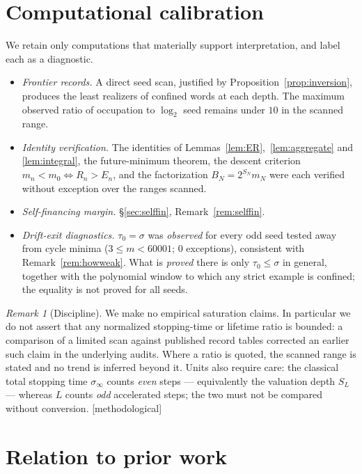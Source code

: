 \documentclass[11pt]{article}
\theoremstyle{plain}
\theoremstyle{definition}
\theoremstyle{remark}
\newtheorem{remark}[theorem]{Remark}
\newcommand{\status}[1]{\textsf{\footnotesize[#1]}}
\begin{document}
\section{Computational calibration}\label{sec:comp}

We retain only computations that materially support interpretation, and label each as a
diagnostic.

\begin{itemize}[leftmargin=1.4em]
\item \emph{Frontier records.} A direct seed scan, justified by Proposition~\ref{prop:inversion},
  produces the least realizers of confined words at each depth. The maximum observed ratio of
  occupation to $\log_2$ seed remains under $10$ in the scanned range.
\item \emph{Identity verification.} The identities of Lemmas~\ref{lem:ER},~\ref{lem:aggregate} and
  \ref{lem:integral}, the future-minimum theorem, the descent criterion $m_n<m_0\iff R_n>E_n$, and
  the factorization $B_N=2^{S_N}m_N$ were each verified without exception over the ranges scanned.
\item \emph{Self-financing margin.} \S\ref{sec:selffin}, Remark~\ref{rem:selffin}.
\item \emph{Drift-exit diagnostics.} $\tau_0=\sigma$ was \emph{observed} for every odd seed tested
  away from cycle minima ($3\le m<60001$; $0$ exceptions), consistent with
  Remark~\ref{rem:howweak}. What is \emph{proved} there is only $\tau_0\le\sigma$ in general,
  together with the polynomial window to which any strict example is confined; the equality is
  not proved for all seeds.
\end{itemize}

\begin{remark}[Discipline]\label{rem:compdiscipline}
We make no empirical saturation claims. In particular we do not assert that any normalized
stopping-time or lifetime ratio is bounded: a comparison of a limited scan against published record
tables corrected an earlier such claim in the underlying audits. Where a ratio is quoted, the
scanned range is stated and no trend is inferred beyond it. Units also require care: the classical
total stopping time $\sigma_\infty$ counts \emph{even} steps --- equivalently the valuation depth
$S_L$ --- whereas $L$ counts \emph{odd} accelerated steps; the two must not be compared without
conversion. \status{methodological}
\end{remark}

\section{Relation to prior work}\label{sec:prior}
\end{document}

